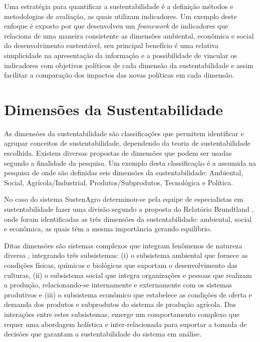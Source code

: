 Uma estratégia para quantificar a sustentabilidade é a definição métodos
e metodologias de avaliação, as quais utilizam indicadores. Um exemplo
deste enfoque é exposto por \citet{AlkanOlsson:2009} que desenvolveu
um \foreignlanguage{english}{\emph{framework}} de indicadores que
relaciona de uma maneira consistente as dimensões ambiental, econômica
e social do desenvolvimento sustentável, seu principal benefício é
uma relativa simplicidade na apresentação da informação e a possibilidade
de vincular os indicadores com objetivos políticos de cada dimensão
da sustentabilidade e assim facilitar a comparação dos impactos das
novas políticas em cada dimensão.

\section{Dimensões da Sustentabilidade}

As dimensões da sustentabilidade são classificações que permitem identificar
e agrupar conceitos de sustentabilidade\citep{AlkanOlsson:2009},
dependendo da teoria de sustentabilidade escolhida. Existem diversas
propostas de dimensões que podem ser usadas segundo a finalidade da
pesquisa. Um exemplo desta classificação é a assumida na pesquisa
de \citet{oliveira:2013} onde são definidas seis dimensões da sustentabilidade:
Ambiental, Social, Agrícola/Industrial, Produtos/Subprodutos, Tecnológica
e Política.

No caso do sistema SustenAgro determinou-se pela equipe de especialistas
em sustentabilidade fazer uma divisão segundo a proposta do Relatório
Brundtland \citep{brundtland1987our}, onde foram identificadas as
três dimensões da sustentabilidade: ambiental, social e econômica,
as quais têm a mesma importância gerando equilíbrio.

Ditas dimensões são sistemas complexos que integram fenômenos de natureza
diversa \citep{simon1991architecture}, integrando três subsistemas:
(i) o subsistema ambiental que fornece as condições físicas, químicas
e biológicas que suportam o desenvolvimento das culturas, (ii) o subsistema
social que integra organizações e pessoas que realizam a produção,
relacionando-se internamente e externamente com os sistemas produtivos
e (iii) o subsistema econômico que estabelece as condições de oferta
e demanda dos produtos e subprodutos do sistema de produção agrícola.
Das interações entre estes subsistemas, emerge um comportamento complexo
que requer uma abordagem holística e inter-relacionada para suportar
a tomada de decisões que garantam a sustentabilidade do sistema em
análise.

